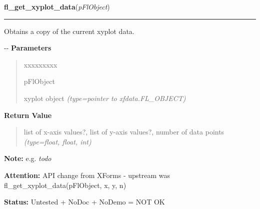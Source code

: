     \vspace{0.5ex}

\hspace{.8\funcindent}\begin{boxedminipage}{\funcwidth}

    \raggedright \textbf{fl\_get\_xyplot\_data}(\textit{pFlObject})

    \vspace{-1.5ex}

    \rule{\textwidth}{0.5\fboxrule}
\setlength{\parskip}{2ex}

Obtains a copy of the current xyplot data.

-{}-
\setlength{\parskip}{1ex}
      \textbf{Parameters}
      \vspace{-1ex}

      \begin{quote}
        \begin{Ventry}{xxxxxxxxx}

          \item[pFlObject]


xyplot object
            {\it (type=pointer to xfdata.FL\_OBJECT)}

        \end{Ventry}

      \end{quote}

      \textbf{Return Value}
    \vspace{-1ex}

      \begin{quote}

list of x-axis values?, list of y-axis values?, number of data
points
      {\it (type=float, float, int)}

      \end{quote}

\textbf{Note:} 
e.g. \emph{todo}


\textbf{Attention:} 
API change from XForms - upstream was
fl\_get\_xyplot\_data(pFlObject, x, y, n)


\textbf{Status:} 
Untested + NoDoc + NoDemo = NOT OK


    \end{boxedminipage}

    \label{xformslib:flxyplot:fl_get_xyplot_data_pointer}

    \vspace{0.5ex}

